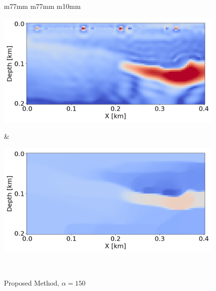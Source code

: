 \begin{figure}[htbp]
\begin{tabular}{m{77mm} m{77mm} m{10mm}}
        \begin{minipage}[b]{\linewidth}
            \centering
            \includegraphics[width=\linewidth]{public/gradient}
            \vspace{-7mm}
            \caption*{}
            \vspace{1mm}
        \end{minipage} &
        \begin{minipage}[b]{\linewidth}
            \centering
            \vspace{-2mm}
            \includegraphics[width=\linewidth]{public/alpha_150}
            \vspace{-9mm}
            \caption*{Proposed Method, $\alpha = 150$}
            \vspace{1mm}
        \end{minipage} \\


\end{tabular}
\end{figure}
